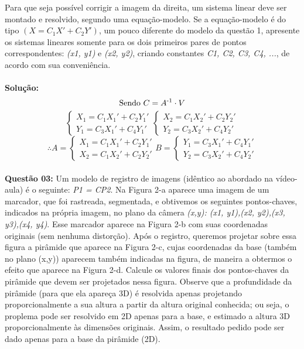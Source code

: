 \noindent Para que seja possível corrigir a imagem da direita, um sistema linear deve ser montado e resolvido, segundo uma equação-modelo. Se a equação-modelo é do tipo $(X = C_1X' + C_2Y')$, um pouco diferente do modelo da questão 1, apresente os sistemas lineares somente para os dois primeiros pares de pontos correspondentes: \emph{(x1, y1)} e \emph{(x2, y2)}, criando constantes \emph{C1, C2, C3, C4, ...}, de acordo com sua conveniência.
\\
\\
\noindent\textbf{Solução:}\\
\noindent{}
\[
\text{Sendo } C = A\textsuperscript{-1} \cdot V
\]
\[
\begin{cases}
X_1 = C_1 X_1'+ C_2 Y_1' \\
Y_1 = C_3 X_1' + C_4 Y_1'
\end{cases}
\begin{cases}
X_2 = C_1 X_2' + C_2 Y_2' \\
Y_2 = C_3 X_2' + C_4 Y_2'
\end{cases}
\]
\[
\therefore
A = 
\begin{cases}
X_1 = C_1 X_1' + C_2 Y_1' \\
X_2 = C_1 X_2' + C_2 Y_2'
\end{cases}
B = 
\begin{cases}
Y_1 = C_3 X_1' + C_4 Y_1' \\
Y_2 = C_3 X_2' + C_4 Y_2'
\end{cases}
\]
\vspace{0.5 cm}
\\
\noindent\textbf{Questão 03:}
Um modelo de registro de imagens (idêntico ao abordado na vídeo-aula) é o seguinte: \emph{{P1 = CP2}}. Na Figura 2-a aparece uma imagem de um marcador, que foi rastreada, segmentada, e obtivemos os seguintes pontos-chaves, indicados na própria imagem, no plano da câmera \emph{(x,y): {(x1, y1),(x2, y2),(x3, y3),(x4, y4)}}. Esse marcador aparece na Figura 2-b com suas coordenadas originais (sem nenhuma distorção). Após o registro, queremos projetar sobre essa figura a pirâmide que aparece na Figura 2-c, cujas coordenadas da base (também no plano (x,y)) aparecem também indicadas na figura, de maneira a obtermos o efeito que aparece na Figura 2-d. Calcule os valores finais dos pontos-chaves da pirâmide que devem ser projetados nessa figura. Observe que a profundidade da pirâmide (para que ela apareça 3D) é resolvida apenas projetando proporcionalmente a sua altura a partir da altura original conhecida; ou seja, o proplema pode ser resolvido em 2D apenas para a base, e estimado a altura 3D proporcionalmente às dimensões originais. Assim, o resultado pedido pode ser dado apenas para a base da pirâmide (2D).
